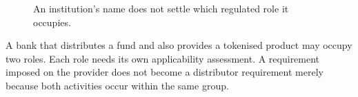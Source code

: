 \begin{figure}[H]
\centering
{}
\caption{An institution's name does not settle which regulated role it occupies.}\label{fig:teach-P-01-problem-01}
\end{figure}

A bank that distributes a fund and also provides a tokenised product may occupy two roles. Each role needs its own applicability assessment. A requirement imposed on the provider does not become a distributor requirement merely because both activities occur within the same group.

